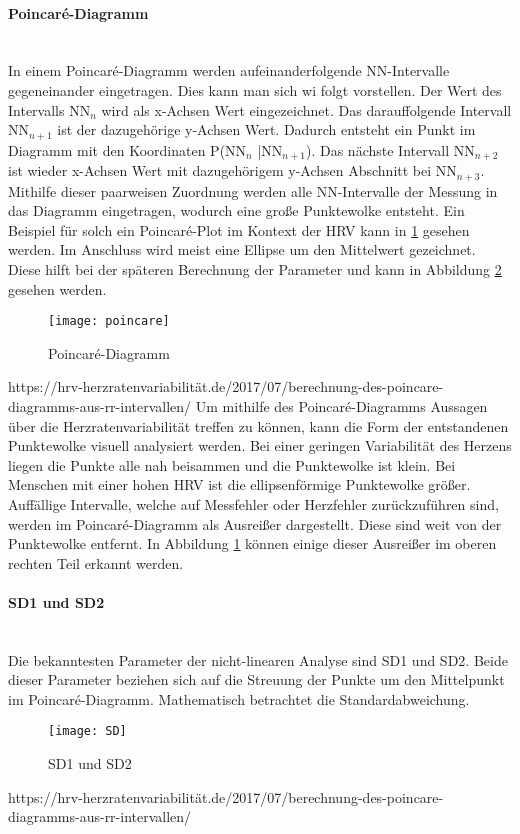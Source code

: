  \paragraph{Poincaré-Diagramm}\mbox{} \\
 In einem Poincaré-Diagramm werden aufeinanderfolgende NN-Intervalle gegeneinander eingetragen. Dies kann man sich wi folgt vorstellen.
 Der Wert des Intervalls NN$_{n}$  wird als x-Achsen Wert eingezeichnet. Das darauffolgende Intervall NN$_{n+1}$ ist der dazugehörige y-Achsen Wert. Dadurch entsteht ein Punkt im Diagramm mit den Koordinaten P(NN$_{n}$ |NN$_{n+1}$). Das nächste Intervall NN$_{n+2}$ ist wieder x-Achsen Wert mit dazugehörigem y-Achsen Abschnitt bei NN$_{n+3}$. Mithilfe dieser paarweisen Zuordnung werden alle NN-Intervalle der Messung in das Diagramm eingetragen, wodurch eine große Punktewolke entsteht. Ein Beispiel für solch ein  Poincaré-Plot im Kontext der HRV kann in \ref{fig:poincare} gesehen werden. \color{red} Im Anschluss wird meist eine Ellipse um den Mittelwert gezeichnet. Diese hilft bei der späteren Berechnung der Parameter und kann in Abbildung \ref{fig:SD} gesehen werden.
 \color{black}
 \begin{figure}[H]
 	\centering
 	\texttt{[image: poincare]}
 	\caption{Poincaré-Diagramm}
 	\label{fig:poincare}
 \end{figure}
https://hrv-herzratenvariabilität.de/2017/07/berechnung-des-poincare-diagramms-aus-rr-intervallen/
Um mithilfe des Poincaré-Diagramms Aussagen über die Herzratenvariabilität treffen zu können, kann die Form der entstandenen Punktewolke visuell analysiert werden. Bei einer geringen Variabilität des Herzens liegen die Punkte alle nah beisammen und die Punktewolke ist klein. Bei Menschen mit einer hohen HRV ist die ellipsenförmige Punktewolke größer. Auffällige Intervalle, welche auf Messfehler oder Herzfehler zurückzuführen sind, werden im Poincaré-Diagramm als Ausreißer dargestellt. Diese sind weit von der Punktewolke entfernt. In Abbildung \ref{fig:poincare} können einige dieser Ausreißer im oberen rechten Teil erkannt werden.

 \paragraph{SD1 und SD2}\mbox{} \\
 Die bekanntesten Parameter der nicht-linearen Analyse sind SD1 und SD2. Beide dieser Parameter beziehen sich auf die Streuung der Punkte um den Mittelpunkt im Poincaré-Diagramm. Mathematisch betrachtet die Standardabweichung. 
 \begin{figure}[H]
	\centering
	\texttt{[image: SD]}
	\caption{SD1 und SD2}
	\label{fig:SD}
\end{figure}
https://hrv-herzratenvariabilität.de/2017/07/berechnung-des-poincare-diagramms-aus-rr-intervallen/

